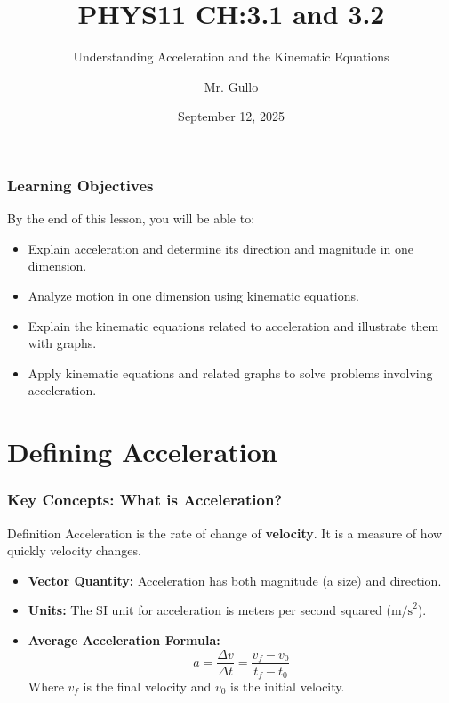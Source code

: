 \documentclass{beamer}
\title[Acceleration and Kinematics]{PHYS11 CH:3.1 and 3.2}
\subtitle{Understanding Acceleration and the Kinematic Equations}
\author[Mr. Gullo]{Mr. Gullo}
\date[Sept 2025]{September 12, 2025}
\begin{document}
\frame{\titlepage}

\begin{frame}
\frametitle{Learning Objectives}
By the end of this lesson, you will be able to:
\pause
\begin{itemize}
    \item Explain acceleration and determine its direction and magnitude in one dimension.
    \pause
    \item Analyze motion in one dimension using kinematic equations.
    \pause
    \item Explain the kinematic equations related to acceleration and illustrate them with graphs.
    \pause
    \item Apply kinematic equations and related graphs to solve problems involving acceleration.
\end{itemize}
\end{frame}

\section{Defining Acceleration}

\begin{frame}
\frametitle{Key Concepts: What is Acceleration?}
\begin{block}{Definition}
    Acceleration is the rate of change of \textbf{velocity}. It is a measure of how quickly velocity changes.
\end{block}
\pause
\begin{itemize}
    \item \textbf{Vector Quantity:} Acceleration has both magnitude (a size) and direction.
    \pause
    \item \textbf{Units:} The SI unit for acceleration is meters per second squared ($\text{m/s}^2$).
    \pause
    \item \textbf{Average Acceleration Formula:}
    \[ \bar{a} = \frac{\Delta v}{\Delta t} = \frac{v_f - v_0}{t_f - t_0} \]
    Where $v_f$ is the final velocity and $v_0$ is the initial velocity.
\end{itemize}
\end{frame}
\end{document}
